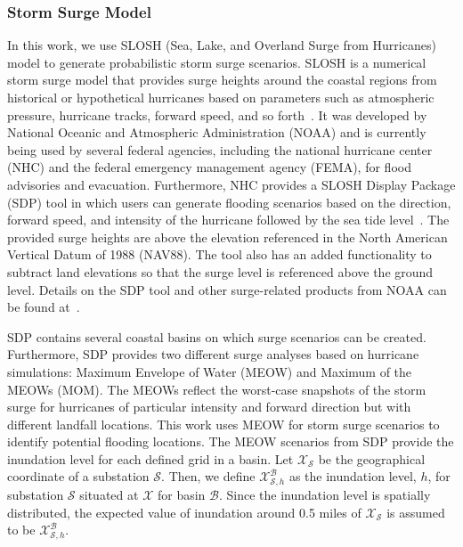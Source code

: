 \documentclass[hidelinks, 12pt]{article}
\begin{document}
\subsubsection{Storm Surge Model}
In this work, we use SLOSH (Sea, Lake, and Overland Surge from Hurricanes) model to generate probabilistic storm surge scenarios. SLOSH is a numerical storm surge model that provides surge heights around the coastal regions from historical or hypothetical hurricanes based on parameters such as atmospheric pressure, hurricane tracks, forward speed, and so forth~\cite{glahn2009role}. It was developed by National Oceanic and Atmospheric Administration (NOAA) and is currently being used by several federal agencies, including the national hurricane center (NHC) and the federal emergency management agency (FEMA), for flood advisories and evacuation. Furthermore, NHC provides a SLOSH Display Package (SDP) tool in which users can generate flooding scenarios based on the direction, forward speed, and intensity of the hurricane followed by the sea tide level~\cite{SDP}. The provided surge heights are above the elevation referenced in the North American Vertical Datum of 1988 (NAV88). The tool also has an added functionality to subtract land elevations so that the surge level is referenced above the ground level. Details on the SDP tool and other surge-related products from NOAA can be found at~\cite{SDP}. 

SDP contains several coastal basins on which surge scenarios can be created. Furthermore, SDP provides two different surge analyses based on hurricane simulations: Maximum Envelope of Water (MEOW) and Maximum of the MEOWs (MOM). The MEOWs reflect the worst-case snapshots of the storm surge for hurricanes of particular intensity and forward direction but with different landfall locations. This work uses MEOW for storm surge scenarios to identify potential flooding locations. The MEOW scenarios from SDP provide the inundation level for each defined grid in a basin. Let $\mathcal{X}_\mathcal{S}$ be the geographical coordinate of a substation $\mathcal{S}$. Then, we define $\mathcal{X}^\mathcal{B}_{\mathcal{S}, h}$ as the inundation level, $h$, for substation $\mathcal{S}$ situated at $\mathcal{X}$ for basin $\mathcal{B}$. Since the inundation level is spatially distributed, the expected value of inundation around 0.5 miles of $\mathcal{X}_\mathcal{S}$ is assumed to be $\mathcal{X}^\mathcal{B}_{\mathcal{S}, h}$. 
\end{document}
